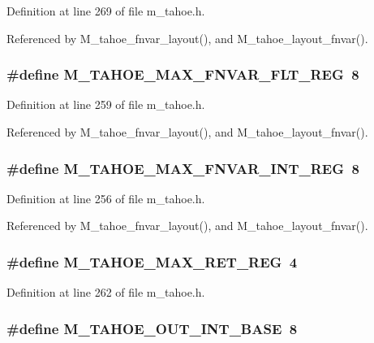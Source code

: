 Definition at line 269 of file m\_\-tahoe.h.

Referenced by M\_\-tahoe\_\-fnvar\_\-layout(), and M\_\-tahoe\_\-layout\_\-fnvar().
\subsubsection{\setlength{\rightskip}{0pt plus 5cm}\#define M\_\-TAHOE\_\-MAX\_\-FNVAR\_\-FLT\_\-REG~8}\label{m__tahoe_8h_a82f08853186e5680255883368256ea4}




Definition at line 259 of file m\_\-tahoe.h.

Referenced by M\_\-tahoe\_\-fnvar\_\-layout(), and M\_\-tahoe\_\-layout\_\-fnvar().
\subsubsection{\setlength{\rightskip}{0pt plus 5cm}\#define M\_\-TAHOE\_\-MAX\_\-FNVAR\_\-INT\_\-REG~8}\label{m__tahoe_8h_5632d160fc0109dbf61491b1f1f35d6a}




Definition at line 256 of file m\_\-tahoe.h.

Referenced by M\_\-tahoe\_\-fnvar\_\-layout(), and M\_\-tahoe\_\-layout\_\-fnvar().
\subsubsection{\setlength{\rightskip}{0pt plus 5cm}\#define M\_\-TAHOE\_\-MAX\_\-RET\_\-REG~4}\label{m__tahoe_8h_9b7e201eb768284eb5658cac13622c57}




Definition at line 262 of file m\_\-tahoe.h.
\subsubsection{\setlength{\rightskip}{0pt plus 5cm}\#define M\_\-TAHOE\_\-OUT\_\-INT\_\-BASE~8}\label{m__tahoe_8h_59c78ddc23bde00f8cbd19c7cf0534fa}




